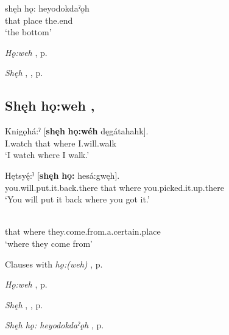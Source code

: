 \ea
\label{ex:shehhoheyo}
\gll shęh hǫ: heyodokdaˀǫh\\
that place the.end\\
\glt ‘the bottom’
\z


\begin{CayugaRelated}
\item \textit{Hǫ:weh} , p. \pageref{p:[hǫ:weh]}\\
\item \textit{Shęh} , , p. \pageref{p:[shęh] `because’}
\end{CayugaRelated}

\subsection*{\textbf{Shęh hǫ:weh} , } \label{p:[shęh hǫ:weh]}

\ea
\label{ex:spart29}
\gll Knigǫhá:ˀ [\textbf{shęh} \textbf{hǫ:wéh} dęgátahahk].\\
I.watch that where I.will.walk\\
\glt ‘I watch where I walk.’
\z

\ea
\label{ex:spart30}
\gll Hętsyę́:ˀ [\textbf{shęh} \textbf{hǫ:} hesá:gwęh].\\
you.will.put.it.back.there that where you.picked.it.up.there\\
\glt ‘You will put it back where you got it.’
\z

\ea
\label{ex:spart31}
\\
that where they.come.from.a.certain.place\\
\glt ‘where they come from’
\z

\largerpage
\begin{CayugaRelated}
\item Clauses with \textit{hǫ:(weh)} , p. \pageref{ch:Clauses with [hǫ:(weh)] ‘the place where’}\\
\item \textit{Hǫ:weh} , p. \pageref{p:[hǫ:weh]}\\
\item \textit{Shęh} , , p. \pageref{p:[shęh] `because’}\\
\item \textit{Shęh hǫ: heyodokdaˀǫh} , p. \pageref{p:[shęh hǫ: heyodokdaˀǫh]}
\end{CayugaRelated}


